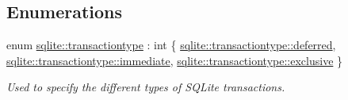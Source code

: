 \subsection*{Enumerations}
\begin{DoxyCompactItemize}
\item 
enum \hyperlink{a00038_a6b830ddde90f9bf8b2b59b395a66ceb8}{sqlite\-::transactiontype} \-: int \{ \hyperlink{a00038_a6b830ddde90f9bf8b2b59b395a66ceb8a43fff3df3fc0b3417c86dc3040fb2d86}{sqlite\-::transactiontype\-::deferred}, 
\hyperlink{a00038_a6b830ddde90f9bf8b2b59b395a66ceb8a516ff1e73f558b0ae701ae4561a63e2c}{sqlite\-::transactiontype\-::immediate}, 
\hyperlink{a00038_a6b830ddde90f9bf8b2b59b395a66ceb8aa4293995cfbfa9ce60ce71ade2ff75f7}{sqlite\-::transactiontype\-::exclusive}
 \}
\begin{DoxyCompactList}\small\item\em Used to specify the different types of S\-Q\-Lite transactions. \end{DoxyCompactList}\end{DoxyCompactItemize}
